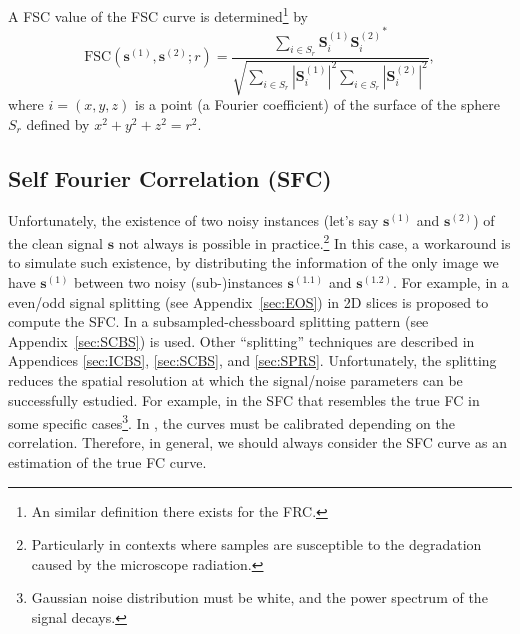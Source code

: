 \documentclass{article}
\begin{document}

A FSC value of the FSC curve is determined\footnote{An similar
  definition there exists for the FRC.} by~\cite{verbeke2024self}
\begin{equation}
\text{FSC}(\mathbf{s}^{(1)}, \mathbf{s}^{(2)}; r) = \frac{\sum_{i \in S_r} \mathbf{S}^{(1)}_i {\mathbf{S}^{(2)}_i}^*}{\sqrt{\sum_{i \in S_r} |\mathbf{S}^{(1)}_i|^2 \sum_{i \in S_r} |\mathbf{S}^{(2)}_i|^2}},
\end{equation}
where $i=(x, y, z)$ is a point (a Fourier coefficient) of the surface
of the sphere $S_r$ defined by $x^2+y^2+z^2=r^2$.

\subsection{Self Fourier Correlation (SFC)}

Unfortunately, the existence of two noisy instances (let's say
$\mathbf{s}^{(1)}$ and $\mathbf{s}^{(2)}$) of the clean signal
$\mathbf{s}$ not always is possible in practice.\footnote{Particularly
  in contexts where samples are susceptible to the degradation caused
  by the microscope radiation.} In this case, a workaround is to
simulate such existence, by distributing the information of the only
image we have $\mathbf{s}^{(1)}$ between two noisy (sub-)instances
$\mathbf{s}^{(1.1)}$ and $\mathbf{s}^{(1.2)}$. For example, in
\cite{verbeke2024self} a even/odd signal splitting (see
Appendix~\ref{sec:EOS}) in 2D slices is proposed to compute the
SFC. In \cite{koho2019fourier} a subsampled-chessboard splitting
pattern (see Appendix~\ref{sec:SCBS}) is used. Other ``splitting''
techniques are described in Appendices \ref{sec:ICBS}, \ref{sec:SCBS},
and \ref{sec:SPRS}. Unfortunately, the splitting reduces the spatial
resolution at which the signal/noise parameters can be successfully
estudied. For example, in \cite{verbeke2024self} the SFC that
resembles the true FC in some specific cases\footnote{Gaussian noise
  distribution must be white, and the power spectrum of the signal
  decays.}. In \cite{koho2019fourier}, the curves must be calibrated
depending on the correlation. Therefore, in general, we should always
consider the SFC curve as an estimation of the true FC curve.
\end{document}
